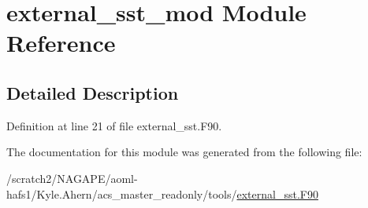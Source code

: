 \section{external\-\_\-sst\-\_\-mod Module Reference}
\label{classexternal__sst__mod}


\subsection{Detailed Description}


Definition at line 21 of file external\-\_\-sst.\-F90.



The documentation for this module was generated from the following file\-:\begin{DoxyCompactItemize}
\item 
/scratch2/\-N\-A\-G\-A\-P\-E/aoml-\/hafs1/\-Kyle.\-Ahern/acs\-\_\-master\-\_\-readonly/tools/\hyperlink{external__sst_8F90}{external\-\_\-sst.\-F90}\end{DoxyCompactItemize}
